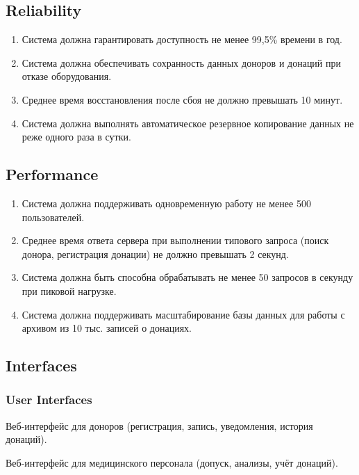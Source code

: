 \documentclass[a4paper,12pt]{article}
\begin{document}
\subsection*{Reliability}

\begin{enumerate}[label=R\arabic*]
  \item Система должна гарантировать доступность не менее 99,5\% времени в год.
  \item Система должна обеспечивать сохранность данных доноров и донаций при отказе оборудования.
  \item Среднее время восстановления после сбоя не должно превышать 10 минут.
  \item Система должна выполнять автоматическое резервное копирование данных не реже одного раза в сутки.
\end{enumerate}

\subsection*{Performance}

\begin{enumerate}[label=P\arabic*]
  \item Система должна поддерживать одновременную работу не менее 500 пользователей.
  \item Среднее время ответа сервера при выполнении типового запроса (поиск донора, регистрация донации) не должно превышать 2 секунд.
  \item Система должна быть способна обрабатывать не менее 50 запросов в секунду при пиковой нагрузке.
  \item Система должна поддерживать масштабирование базы данных для работы с архивом из 10 тыс. записей о донациях.
\end{enumerate}

\subsection*{Interfaces}

\subsubsection*{User Interfaces}

Веб-интерфейс для доноров (регистрация, запись, уведомления, история донаций).

Веб-интерфейс для медицинского персонала (допуск, анализы, учёт донаций).
\end{document}
